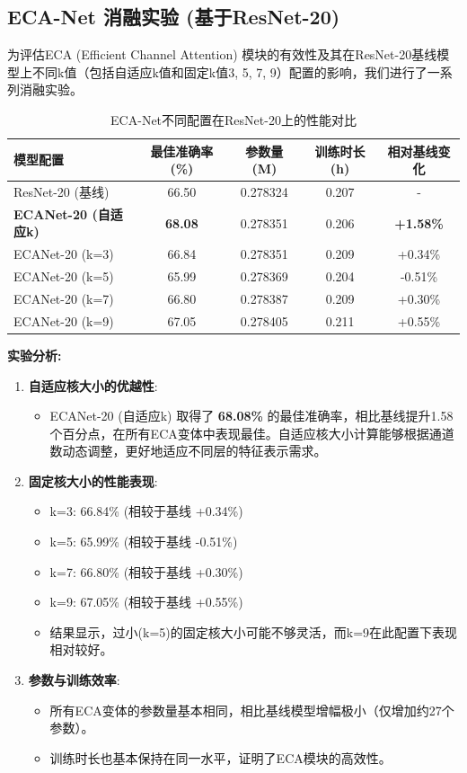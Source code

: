 \documentclass[a4paper]{article}
\begin{document}
\subsection{ECA-Net 消融实验 (基于ResNet-20)}
为评估ECA (Efficient Channel Attention) 模块的有效性及其在ResNet-20基线模型上不同k值（包括自适应k值和固定k值3, 5, 7, 9）配置的影响，我们进行了一系列消融实验。
\begin{table}[H]
\centering
\caption{ECA-Net不同配置在ResNet-20上的性能对比}
\label{tab:eca_ablation}
\begin{tabular}{lcccc}
\toprule
\textbf{模型配置} & \textbf{最佳准确率 (\%)} & \textbf{参数量 (M)} & \textbf{训练时长 (h)} & \textbf{相对基线变化} \\
\midrule
ResNet-20 (基线) & 66.50 & 0.278324 & 0.207 & - \\
\textbf{ECANet-20 (自适应k)} & \textbf{68.08} & 0.278351 & 0.206 & \textbf{+1.58\%} \\
ECANet-20 (k=3) & 66.84 & 0.278351 & 0.209 & +0.34\% \\
ECANet-20 (k=5) & 65.99 & 0.278369 & 0.204 & -0.51\% \\
ECANet-20 (k=7) & 66.80 & 0.278387 & 0.209 & +0.30\% \\
ECANet-20 (k=9) & 67.05 & 0.278405 & 0.211 & +0.55\% \\
\bottomrule
\end{tabular}
\end{table}

\textbf{实验分析:}
\begin{enumerate}
    \item \textbf{自适应核大小的优越性}:
    \begin{itemize}
        \item ECANet-20 (自适应k) 取得了 \textbf{68.08\%} 的最佳准确率，相比基线提升1.58个百分点，在所有ECA变体中表现最佳。自适应核大小计算能够根据通道数动态调整，更好地适应不同层的特征表示需求。
    \end{itemize}
    \item \textbf{固定核大小的性能表现}:
    \begin{itemize}
        \item k=3: 66.84\% (相较于基线 +0.34\%)
        \item k=5: 65.99\% (相较于基线 -0.51\%)  
        \item k=7: 66.80\% (相较于基线 +0.30\%)
        \item k=9: 67.05\% (相较于基线 +0.55\%)
        \item 结果显示，过小(k=5)的固定核大小可能不够灵活，而k=9在此配置下表现相对较好。
    \end{itemize}
    \item \textbf{参数与训练效率}:
    \begin{itemize}
        \item 所有ECA变体的参数量基本相同，相比基线模型增幅极小（仅增加约27个参数）。
        \item 训练时长也基本保持在同一水平，证明了ECA模块的高效性。
    \end{itemize}
\end{enumerate}
\end{document}
